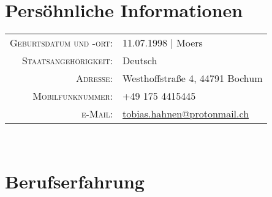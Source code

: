 \documentclass[10pt,a4paper]{article}
\begin{document}
%
%
\par{
	\bigskip\par
}


%
%
%
\section{Pers\"ohnliche Informationen}

\begin{tabular}{rl}
    \textsc{Geburtsdatum und -ort:}	& 11.07.1998 | Moers \\
    \textsc{Staatsangeh\"origkeit:}	& Deutsch \\
    \textsc{Adresse:}				& Westhoffstraße 4, 44791 Bochum \\
    \textsc{Mobilfunknummer:}		& +49 175 4415445 \\
    \textsc{e-Mail:}				& \href{mailto:tobias.hahnen@protonmail.ch}{tobias.hahnen@protonmail.ch}
\end{tabular} \\


\section{Berufserfahrung}
\end{document}
